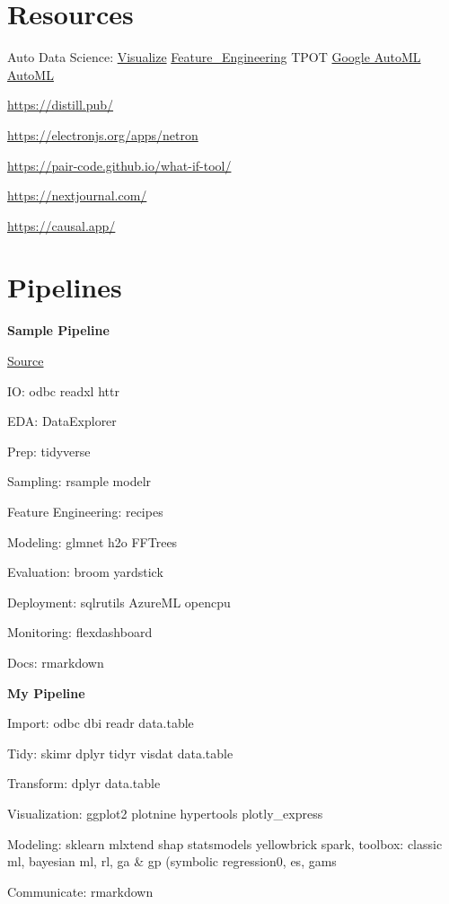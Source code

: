\documentclass[]{book}
\begin{document}
\hypertarget{resources}{%
\section{Resources}\label{resources}}

Auto Data Science: \href{http://holoviews.org}{Visualize} \href{https://www.featuretools.com}{Feature\_Engineering} TPOT \href{https://cloud.google.com/automl/}{Google AutoML} \href{https://www.automl.org/}{AutoML}

\url{https://distill.pub/}

\url{https://electronjs.org/apps/netron}

\url{https://pair-code.github.io/what-if-tool/}

\url{https://nextjournal.com/}

\url{https://causal.app/}

\hypertarget{pipelines}{%
\section{Pipelines}\label{pipelines}}

\textbf{Sample Pipeline}

\href{https://mobile.twitter.com/TheStephLocke/status/990251709531344896}{Source}

IO: odbc readxl httr

EDA: DataExplorer

Prep: tidyverse

Sampling: rsample modelr

Feature Engineering: recipes

Modeling: glmnet h2o FFTrees

Evaluation: broom yardstick

Deployment: sqlrutils AzureML opencpu

Monitoring: flexdashboard

Docs: rmarkdown

\textbf{My Pipeline}

Import: odbc dbi readr data.table

Tidy: skimr dplyr tidyr visdat data.table

Transform: dplyr data.table

Visualization: ggplot2 plotnine hypertools plotly\_express

Modeling: sklearn mlxtend shap statsmodels yellowbrick spark, toolbox: classic ml, bayesian ml, rl, ga \& gp (symbolic regression0, es, gams

Communicate: rmarkdown
\end{document}
